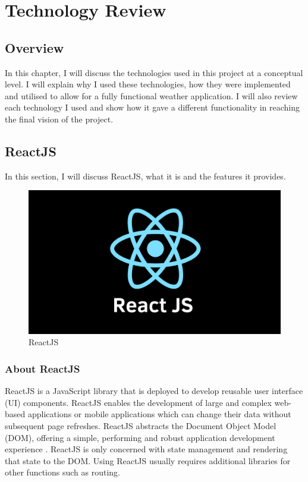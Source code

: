 \chapter{Technology Review}
\section{Overview}
In this chapter, I will discuss the technologies used in this project at a conceptual level. I will explain why I used these technologies, how they were implemented and utilised to allow for a fully functional weather application. I will also review each technology I used and show how it gave a different functionality in reaching the final vision of the project. 

\section{ReactJS}
In this section, I will discuss ReactJS, what it is and the features it provides.

\begin{figure}[h]
\centering
\includegraphics[scale=0.2]{img/ReactJS.png}
\caption{ReactJS}
\label{React}
\end{figure}

\subsection{About ReactJS}
ReactJS is a JavaScript library that is deployed to develop reusable user interface (UI) components. ReactJS enables the development of large and complex web-based applications or mobile applications which can change their data without subsequent page refreshes. ReactJS abstracts the Document Object Model (DOM), offering a simple, performing and robust application development experience \cite{aggarwal2018modern}. ReactJS is only concerned with state management and rendering that state to the DOM. Using ReactJS usually requires additional libraries for other functions such as routing.


